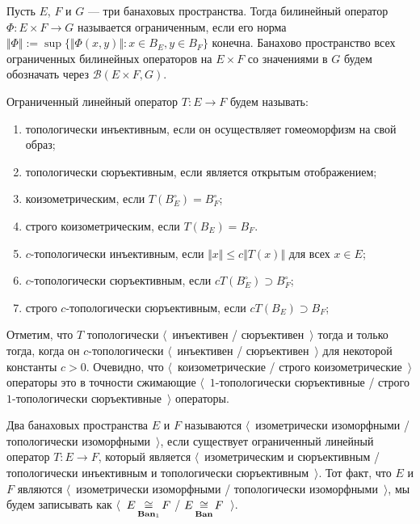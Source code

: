 Пусть $E$, $F$ и $G$ --- три банаховых пространства. Тогда билинейный оператор
$\Phi:E\times F\to G$ называется ограниченным, если его норма $\Vert
\Phi\Vert:=\sup \{\Vert \Phi(x,y)\Vert:x\in B_E, y\in B_F \}$ конечна. Банахово
пространство всех ограниченных билинейных операторов на $E\times F$ со
значениями в $G$ будем обозначать через $\mathcal{B}(E\times F,G)$.

Ограниченный линейный оператор $T:E\to F$ будем называть:
\begin{enumerate}[label = (\roman*)] 
    \item топологически инъективным, если он осуществляет гомеоморфизм на свой
    образ;

    \item топологически сюръективным, если является открытым отображением;

    \item коизометрическим, если $T(B_E^\circ)=B_F^\circ$;

    \item строго коизометрическим, если $T(B_E)=B_F$. 

    \item $c$-топологически инъективным, если $\Vert x\Vert\leq c\Vert
    T(x)\Vert$ для всех $x\in E$;

    \item $c$-топологически сюръективным, если $cT(B_E^\circ)\supset B_F^\circ$;

    \item строго $c$-топологически сюръективным, если $cT(B_E)\supset B_F$; 
\end{enumerate}

Отметим, что $T$ топологически $\langle$~инъективен / сюръективен~$\rangle$
тогда и только тогда, когда он $c$-топологически $\langle$~инъективен /
сюръективен~$\rangle$ для некоторой константы $c>0$. Очевидно, что
$\langle$~коизометрические / строго коизометрические~$\rangle$ операторы это в
точности сжимающие $\langle$~$1$-топологически сюръективные / строго
$1$-топологически сюръективные~$\rangle$ операторы.

Два банаховых пространства $E$ и $F$ называются $\langle$~изометрически
изоморфными / топологически изоморфными~$\rangle$, если существует ограниченный
линейный оператор $T:E\to F$, который является $\langle$~изометрическим и
сюръективным / топологически инъективным и топологически сюръективным~$\rangle$.
Тот факт, что $E$ и $F$ являются $\langle$~изометрически изоморфными /
топологически изоморфными~$\rangle$, мы будем записывать как
$\langle$~$E\mathop{\mathbin{\cong}}\limits_{\mathbf{Ban}_1}F$ / $E\mathop{\mathbin{\cong}}\limits_{\mathbf{Ban}}F$~$\rangle$.

